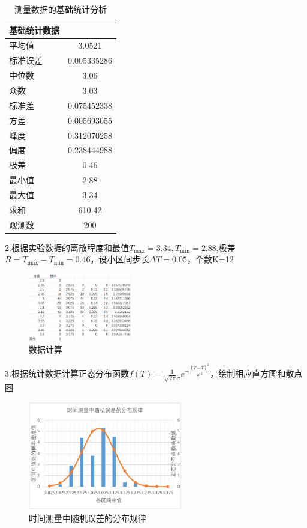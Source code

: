 \documentclass[12pt,a4paper]{article}
\begin{document}
	\begin{table}[h]
    	\centering
    	\renewcommand{\arraystretch}{1.3} %
    	\begin{tabular}{l c}
        	\toprule
        	\textbf{基础统计数据} & \\
        	\midrule
        	平均值   & 3.0521 \\
        	标准误差 & 0.005335286 \\
        	中位数   & 3.06 \\
        	众数     & 3.03 \\
        	标准差   & 0.075452338 \\
        	方差     & 0.005693055 \\
        	峰度     & 0.312070258 \\
        	偏度     & 0.238444988 \\
        	极差     & 0.46 \\
        	最小值   & 2.88 \\
        	最大值   & 3.34 \\
        	求和     & 610.42 \\
        	观测数   & 200 \\
        	\bottomrule
    	\end{tabular}
    	\caption{测量数据的基础统计分析}
    	\label{tab:stats}
	\end{table}
	
	2.根据实验数据的离散程度和最值$T_{\max}=3.34,T_{\min}=2.88$,极差$R=T_{\max}-T_{\min}=0.46$，设小区间步长$\Delta T=0.05$，个数K=12
		\begin{figure}[H]
		\centering
		\includegraphics[width=0.4\textwidth]{图一.png}
		\caption{数据计算}
		\label{fig:chart1}
	\end{figure}


	3.根据统计数据计算正态分布函数$f(T)=\frac{1}{\sqrt{2\pi}\sigma}e^{-\frac{(T-\bar{T})^2}{2\sigma^2}}$，绘制相应直方图和散点图
	\begin{figure}[H]
		\centering
		\includegraphics[width=0.6\textwidth]{图二.png}
		\caption{时间测量中随机误差的分布规律}
		\label{fig:chart1}
	\end{figure}
	
\end{document}

